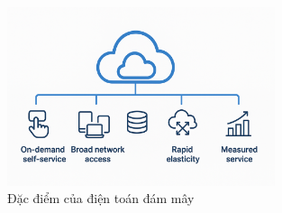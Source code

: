 \begin{figure}[H] %
    \centering
    \includegraphics[width=0.7\textwidth]{Tong_quan_DTDM/Dac_diem_DTDM.png}
    \caption{Đặc điểm của điện toán đám mây}
    \label{fig:cloud_intro}
\end{figure}

